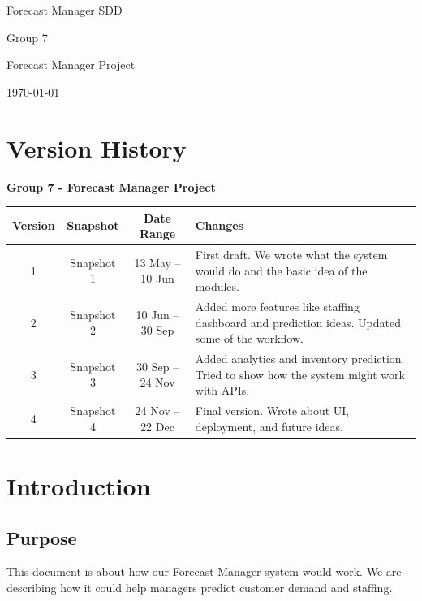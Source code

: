 \documentclass[12pt]{report}
\begin{document}
\begin{titlepage}
\centering
\vspace*{1in}

{\Huge Forecast Manager SDD \par}
\vspace{1in}

{\Large Group 7 \par}
\vspace{0.5in}

{\large Forecast Manager Project \par}
\vfill

{\large \today \par}
\end{titlepage}

\section*{Version History}

\textbf{Group 7 - Forecast Manager Project}

\begin{tabular}{|c|c|c|p{8cm}|}
\hline
Version & Snapshot & Date Range & Changes \\ \hline
1 & Snapshot 1 & 13 May – 10 Jun & First draft. We wrote what the system would do and the basic idea of the modules. \\ \hline
2 & Snapshot 2 & 10 Jun – 30 Sep & Added more features like staffing dashboard and prediction ideas. Updated some of the workflow. \\ \hline
3 & Snapshot 3 & 30 Sep – 24 Nov & Added analytics and inventory prediction. Tried to show how the system might work with APIs. \\ \hline
4 & Snapshot 4 & 24 Nov – 22 Dec & Final version. Wrote about UI, deployment, and future ideas. \\ \hline
\end{tabular}

\section{Introduction}

\subsection{Purpose}
This document is about how our Forecast Manager system would work. We are describing how it could help managers predict customer demand and staffing.
\end{document}
